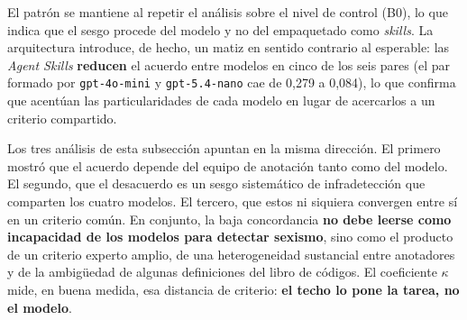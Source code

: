 El patrón se mantiene al repetir el análisis sobre el nivel de control (B0), lo que
indica que el sesgo procede del modelo y no del empaquetado como \textit{skills}. La
arquitectura introduce, de hecho, un matiz en sentido contrario al esperable: las
\textit{Agent Skills} \textbf{reducen} el acuerdo entre modelos en cinco de los seis
pares (el par formado por \texttt{gpt-4o-mini} y \texttt{gpt-5.4-nano} cae de 0,279 a
0,084), lo que confirma que acentúan las particularidades de cada modelo en lugar de
acercarlos a un criterio compartido.

Los tres análisis de esta subsección apuntan en la misma dirección. El primero
mostró que el acuerdo depende del equipo de anotación tanto como del modelo. El
segundo, que el desacuerdo es un sesgo sistemático de infradetección que comparten
los cuatro modelos. El tercero, que estos ni siquiera convergen entre sí en un
criterio común. En conjunto, la baja concordancia \textbf{no debe leerse como
incapacidad de los modelos para detectar sexismo}, sino como el producto de un
criterio experto amplio, de una heterogeneidad sustancial entre anotadores y de la
ambigüedad de algunas definiciones del libro de códigos. El coeficiente $\kappa$ mide, en
buena medida, esa distancia de criterio: \textbf{el techo lo pone la tarea, no el
modelo}.
